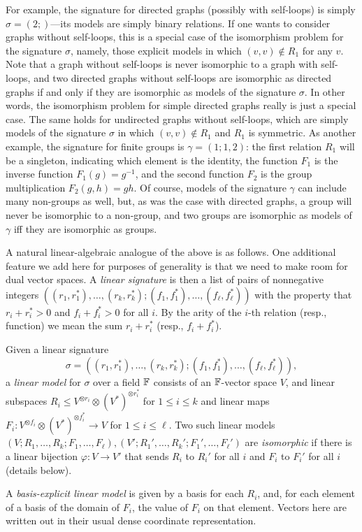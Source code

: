 \documentclass[11pt]{article}
\begin{document}
For example, the signature for directed graphs (possibly with self-loops) is simply $\sigma=(2; )$---its models are simply binary relations. If one wants to consider graphs without self-loops, this is a special case of the isomorphism problem for the signature $\sigma$, namely, those explicit models in which $(v,v) \notin R_1$ for any $v$. Note that a graph without self-loops is never isomorphic to a graph with self-loops, and two directed graphs without self-loops are isomorphic as directed graphs if and only if they are isomorphic as models of the signature $\sigma$. In other words, the isomorphism problem for simple directed graphs really is just a special case. The same holds for undirected graphs without self-loops, which are simply models of the signature $\sigma$ in which $(v,v) \notin R_1$ and $R_1$ is symmetric. As another example, the signature for finite groups is $\gamma = (1; 1,2)$: the first relation $R_1$ will be a singleton, indicating which element is the identity, the function $F_1$ is the inverse function $F_1(g) = g^{-1}$, and the second function $F_2$ is the group multiplication $F_2(g,h) = gh$. Of course, models of the signature $\gamma$ can include many non-groups as well, but, as was the case with directed graphs, a group will never be isomorphic to a non-group, and two groups are isomorphic as models of $\gamma$ iff they are isomorphic as groups.

A natural linear-algebraic analogue of the above is as follows. One additional feature we add here for purposes of generality is that we need to make room for dual vector spaces. A \emph{linear signature} is then a list of pairs of nonnegative integers $((r_1, r_1^*), \dotsc, (r_k, r_k^*); (f_1, f_1^*), \dotsc, (f_\ell, f_\ell^*))$ with the property that $r_i + r_i^* > 0$ and $f_i + f_i^* > 0$ for all $i$. By the arity of the $i$-th relation (resp., function) we mean the sum $r_i + r_i^*$ (resp., $f_i + f_i^*$).

\begin{definition}
Given a linear signature 
$$\sigma = ((r_1, r_1^*), \dotsc, (r_k, r_k^*); (f_1, f_1^*), \dotsc, (f_\ell, 
f_\ell^*)),$$ a \emph{linear model} for $\sigma$ over a field $\mathbb{F}$ consists of an 
$\mathbb{F}$-vector space $V$, and linear subspaces $R_i \leq V^{\otimes r_i} \otimes 
(V^*)^{\otimes r_i^*}$ for $1 \leq i \leq k$ and linear maps $F_i \colon 
V^{\otimes f_i} \otimes (V^*)^{\otimes f_i^*} \to V$ for $1 \leq i \leq \ell$. Two 
such linear models $(V; R_1, \dotsc, R_k; F_1, \dotsc, F_\ell), (V'; R_1', \dotsc, 
R_k'; F_1', \dotsc, F_\ell')$ are \emph{isomorphic} if there is a linear bijection 
$\varphi\colon V \to V'$ that sends $R_i$ to $R_i'$ for all $i$ and $F_i$ to 
$F_i'$ for all $i$ (details below). 

A \emph{basis-explicit linear model} is given by a basis for each $R_i$, and, for each element of a basis of the domain of $F_i$, the value of $F_i$ on that element. Vectors here are written out in their usual dense coordinate representation.
\end{definition}
\end{document}
